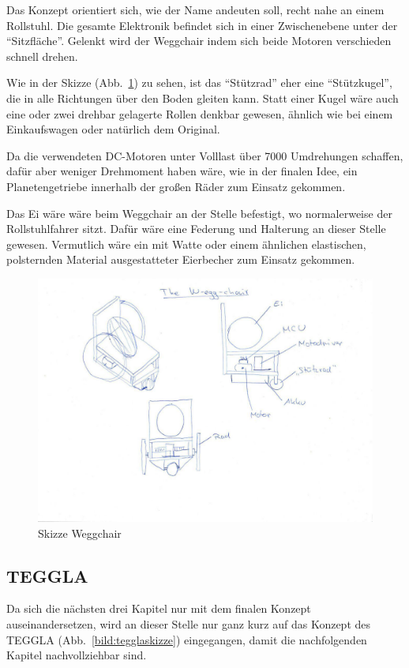 Das Konzept orientiert sich, wie der Name andeuten soll, recht nahe an einem Rollstuhl. 
Die gesamte Elektronik befindet sich in einer Zwischenebene unter der ``Sitzfläche''. 
Gelenkt wird der Weggchair indem sich beide Motoren verschieden schnell drehen. 

Wie in der Skizze (Abb.~\ref{bild:weggchair}) zu sehen, ist das ``Stützrad'' eher eine ``Stützkugel'', die in alle Richtungen über den Boden gleiten kann. 
Statt einer Kugel wäre auch eine oder zwei drehbar gelagerte Rollen denkbar gewesen, ähnlich wie bei einem Einkaufswagen oder natürlich dem Original. 

Da die verwendeten DC-Motoren unter Volllast über 7000 Umdrehungen schaffen, dafür aber weniger Drehmoment haben wäre, wie in der finalen Idee, ein Planetengetriebe innerhalb der großen Räder zum Einsatz gekommen. 

Das Ei wäre wäre beim Weggchair an der Stelle befestigt, wo normalerweise der Rollstuhlfahrer sitzt. Dafür wäre eine Federung und Halterung an dieser Stelle gewesen. Vermutlich wäre ein mit Watte oder einem ähnlichen elastischen, polsternden Material ausgestatteter Eierbecher zum Einsatz gekommen.

\begin{figure}[!ht]
	\centering
	\includegraphics[width=\textwidth]{bilder/weggchair.jpg}
	\caption{Skizze Weggchair}
	\label{bild:weggchair}
\end{figure}


\subsection{TEGGLA}
Da sich die nächsten drei Kapitel nur mit dem finalen Konzept auseinandersetzen, wird an dieser Stelle nur ganz kurz auf das Konzept des TEGGLA (Abb.~\ref{bild:tegglaskizze}) eingegangen, damit die nachfolgenden Kapitel nachvollziehbar sind. 

